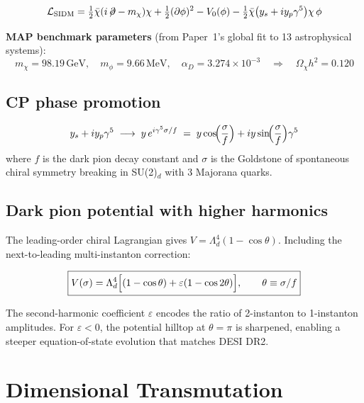 \documentclass[11pt,a4paper]{article}
\newcommand{\Ld}{\Lambda_d}
\newcommand{\GeV}{\,\mathrm{GeV}}
\newcommand{\MeV}{\,\mathrm{MeV}}
\begin{document}
\begin{equation}\label{eq:lag}
\mathcal{L}_{\mathrm{SIDM}} = \tfrac{1}{2}\bar\chi(i\!\not\!\partial - m_\chi)\chi
+ \tfrac{1}{2}(\partial\phi)^2 - V_0(\phi)
- \tfrac{1}{2}\bar\chi\bigl(y_s + iy_p\gamma^5\bigr)\chi\,\phi
\end{equation}

\noindent
\textbf{MAP benchmark parameters} (from Paper~1's global fit to 13 astrophysical systems):
\begin{equation}
  m_\chi = 98.19\GeV, \quad m_\phi = 9.66\MeV, \quad \alpha_D = 3.274\times 10^{-3}
  \quad\Rightarrow\quad \Omega_\chi h^2 = 0.120
\end{equation}

\subsection{CP phase promotion}

\begin{equation}\label{eq:promotion}
  y_s + iy_p\gamma^5 \;\longrightarrow\; y\,e^{i\gamma^5\sigma/f}
  \;=\; y\cos\!\Bigl(\frac{\sigma}{f}\Bigr) + iy\sin\!\Bigl(\frac{\sigma}{f}\Bigr)\gamma^5
\end{equation}
where $f$ is the dark pion decay constant and $\sigma$ is the Goldstone of spontaneous chiral
symmetry breaking in SU(2)$_d$ with 3 Majorana quarks.

\subsection{Dark pion potential with higher harmonics}

The leading-order chiral Lagrangian gives $V=\Ld^4(1-\cos\theta)$.
Including the next-to-leading multi-instanton correction:

\begin{equation}\label{eq:potential}
  \boxed{V(\sigma) = \Ld^4\Bigl[(1 - \cos\theta) + \varepsilon(1 - \cos 2\theta)\Bigr],
  \qquad \theta \equiv \sigma/f}
\end{equation}

The second-harmonic coefficient $\varepsilon$ encodes the ratio of 2-instanton to 1-instanton
amplitudes. For $\varepsilon < 0$, the potential hilltop at $\theta = \pi$ is sharpened,
enabling a steeper equation-of-state evolution that matches DESI DR2.

\section{Dimensional Transmutation}
\label{sec:transmutation}
\end{document}
